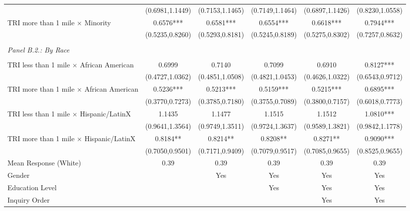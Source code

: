 \begin{table}[H]
\begin{threeparttable}
\begin{tabular}{@{\extracolsep{5pt}}lccccc}
                    &(0.6981,1.1449)   &(0.7153,1.1465)   &(0.7149,1.1464)   &(0.6897,1.1426)   &(0.8230,1.0558)   \\
TRI more than 1 mile $\times$  Minority&      0.6576***&      0.6581***&      0.6554***&      0.6618***&      0.7944***\\
                    &(0.5235,0.8260)   &(0.5293,0.8181)   &(0.5245,0.8189)   &(0.5275,0.8302)   &(0.7257,0.8632)   \\
       \hline \\[-1.8ex] 
         
{\it Panel B.2.: By Race }\\                                          &  &  &    \\
TRI less than 1 mile $\times$ African American&      0.6999   &      0.7140   &      0.7099   &      0.6910   &      0.8127***\\
                    &(0.4727,1.0362)   &(0.4851,1.0508)   &(0.4821,1.0453)   &(0.4626,1.0322)   &(0.6543,0.9712)   \\
TRI more than 1 mile $\times$  African American&      0.5236***&      0.5213***&      0.5159***&      0.5215***&      0.6895***\\
                    &(0.3770,0.7273)   &(0.3785,0.7180)   &(0.3755,0.7089)   &(0.3800,0.7157)   &(0.6018,0.7773)   \\
TRI less than 1 mile $\times$ Hispanic/LatinX&      1.1435   &      1.1477   &      1.1515   &      1.1512   &      1.0810***\\
                    &(0.9641,1.3564)   &(0.9749,1.3511)   &(0.9724,1.3637)   &(0.9589,1.3821)   &(0.9842,1.1778)   \\
TRI more than 1 mile $\times$  Hispanic/LatinX&      0.8184** &      0.8214** &      0.8208** &      0.8271** &      0.9090***\\
                    &(0.7050,0.9501)   &(0.7171,0.9409)   &(0.7079,0.9517)   &(0.7085,0.9655)   &(0.8525,0.9655)   \\
\hline
 Mean Response (White)&        0.39   &        0.39   &        0.39   &        0.39   &        0.39   \\
\hline Gender       &               &         Yes   &         Yes   &         Yes   &         Yes   \\
Education Level     &               &               &         Yes   &         Yes   &         Yes   \\
Inquiry Order       &               &               &               &         Yes   &         Yes   \\

\end{tabular}
\end{threeparttable}
\end{table}
